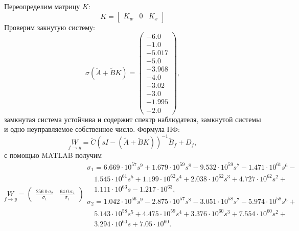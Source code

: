 Переопределим матрицу $K$:
\begin{equation*}
    K=\begin{bmatrix}
        K_w&0&K_x
    \end{bmatrix}
\end{equation*}
Проверим закнутую систему:
\begin{equation*}
    \sigma(\tilde A+\tilde BK)=\left(\begin{array}{c}
-6.0\\
-1.0\\
-5.017\\
-5.0\\
-3.968\\
-4.0\\
-3.02\\
-3.0\\
-1.995\\
-2.0
\end{array}\right),
\end{equation*}
замкнутая система устойчива и содержит спектр наблюдателя, замкнутой системы и одно неуправляемое
собственное число.
Формула ПФ:
\begin{equation*}
    \underset{f\rightarrow y}{W}=\tilde C(sI-(\tilde A+\tilde BK))^{-1}\tilde B_f+D_f,
\end{equation*}
с помощью MATLAB получим
\begin{equation*}
    \underset{f\rightarrow y}{W} =
    \left(\begin{array}{cc}
        \frac{256.0\,\sigma_2}{\sigma_1} & \frac{64.0\,\sigma_2}{\sigma_1}
    \end{array}\right)
    \begin{array}{l}
        \sigma_1 = 6.669 \cdot 10^{57}s^9 + 1.679 \cdot 10^{59}s^8 - 9.532 \cdot 10^{59}s^7 - 1.471 \cdot 10^{61}s^6 -\\
        \quad 1.545 \cdot 10^{61}s^5 + 1.199 \cdot 10^{62}s^4 + 2.038 \cdot 10^{62}s^3 + 4.727 \cdot 10^{62}s^2 +\\
        \quad 1.111 \cdot 10^{63}s - 1.217 \cdot 10^{63},\\[8pt]
        \sigma_2 = 1.042 \cdot 10^{56}s^9 - 2.875 \cdot 10^{57}s^8 - 3.051 \cdot 10^{58}s^7 - 5.974 \cdot 10^{58}s^6 +\\
        \quad 5.143 \cdot 10^{58}s^5 + 4.475 \cdot 10^{59}s^4 + 3.376 \cdot 10^{60}s^3 + 7.554 \cdot 10^{60}s^2 +\\
        \quad 3.294 \cdot 10^{60}s + 7.05 \cdot 10^{60}.
    \end{array}
\end{equation*}
